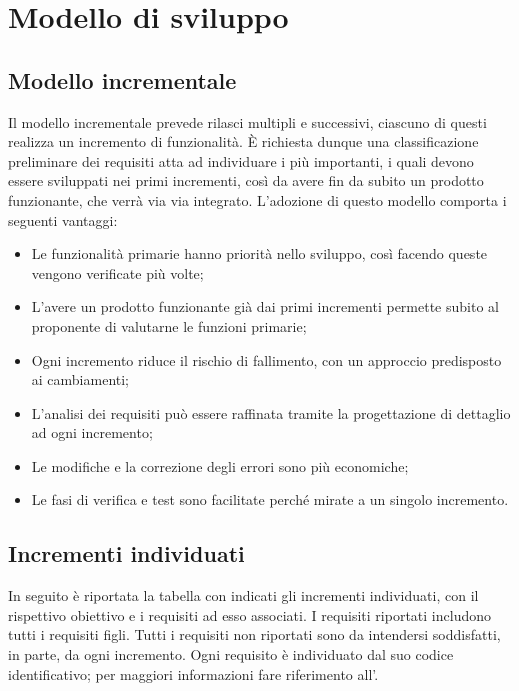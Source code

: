 \section{Modello di sviluppo}

\subsection{Modello incrementale}
Il modello incrementale prevede rilasci multipli e successivi, ciascuno di questi realizza un incremento di funzionalità.
È richiesta dunque una classificazione preliminare dei requisiti atta ad individuare i più importanti, i quali devono essere sviluppati nei primi incrementi, così da avere fin da subito un prodotto funzionante, che verrà via via integrato.
L'adozione di questo modello comporta i seguenti vantaggi:
\begin{itemize}
\item Le funzionalità primarie hanno priorità nello sviluppo, così facendo queste vengono verificate più volte;
\item L'avere un prodotto funzionante già dai primi incrementi permette subito al proponente di valutarne le funzioni primarie;
\item Ogni incremento riduce il rischio di fallimento, con un approccio predisposto ai cambiamenti;
\item L'analisi dei requisiti può essere raffinata tramite la progettazione di dettaglio ad ogni incremento;
\item Le modifiche e la correzione degli errori sono più economiche;
\item Le fasi di verifica e test sono facilitate perché mirate a un singolo incremento.
\end{itemize}

\subsection{Incrementi individuati}
In seguito è riportata la tabella con indicati gli incrementi individuati, con il rispettivo obiettivo e i requisiti ad esso associati. 
I requisiti riportati includono tutti i requisiti figli. Tutti i requisiti non riportati sono da intendersi soddisfatti, in parte, da ogni incremento.
Ogni requisito è individuato dal suo codice identificativo; per maggiori informazioni fare riferimento all'\AdRv{}.


